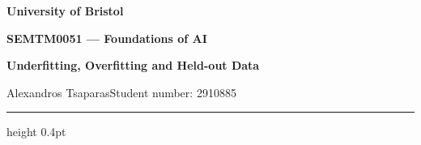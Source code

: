 \documentclass[11pt,a4paper]{article}
\newcommand{\studentname}{Alexandros Tsaparas}
\newcommand{\studentnumber}{2910885}
\begin{document}
\color{charcoal}
{\small\bfseries University of Bristol}\par
{\large\bfseries SEMTM0051 --- Foundations of AI}\par
{\Large\bfseries\color{accent}Underfitting, Overfitting and Held-out Data}\par
{\small\studentname\hfill Student number: \studentnumber}\par
\vspace{2pt}\hrule height 0.4pt\vspace{3pt}









\clearpage

\end{document}
